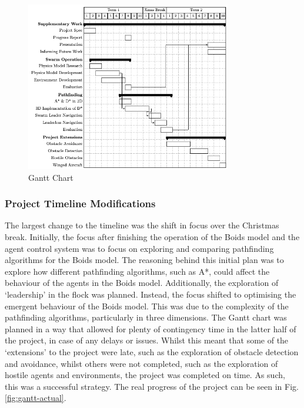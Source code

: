 \documentclass[12pt]{article}
\begin{document}
\begin{figure}[ht]
    \centering
    \includegraphics[width=0.8\textwidth]{gantt.png}
    \caption{Gantt Chart}
    \label{fig:gantt-eval}
\end{figure}

\subsubsection{Project Timeline Modifications}
The largest change to the timeline was the shift in focus over the Christmas break. Initially, the focus after finishing the operation of the Boids model and the agent control system was to focus on exploring and comparing pathfinding algorithms for the Boids model. The reasoning behind this initial plan was to explore how different pathfinding algorithms, such as A*, could affect the behaviour of the agents in the Boids model. Additionally, the exploration of `leadership' in the flock was planned. Instead, the focus shifted to optimising the emergent behaviour of the Boids model. This was due to the complexity of the pathfinding algorithms, particularly in three dimensions. The Gantt chart was planned in a way that allowed for plenty of contingency time in the latter half of the project, in case of any delays or issues. Whilst this meant that some of the `extensions' to the project were late, such as the exploration of obstacle detection and avoidance, whilst others were not completed, such as the exploration of hostile agents and environments, the project was completed on time. As such, this was a successful strategy. The real progress of the project can be seen in Fig. \ref{fig:gantt-actual}.
\end{document}
